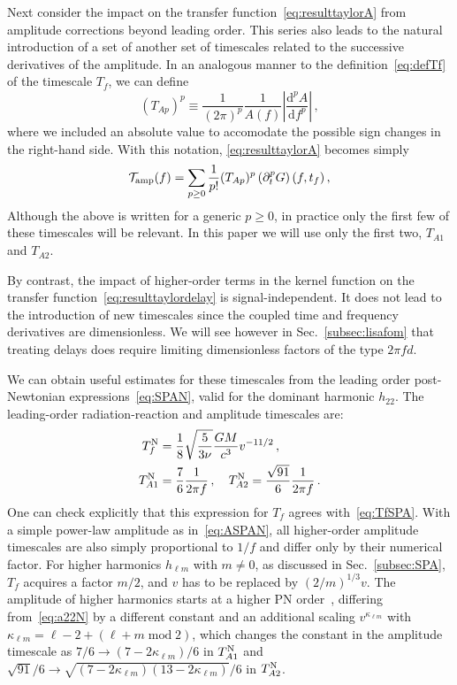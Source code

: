 \documentclass[aps,showpacs,twocolumn,
prd,superscriptaddress,nofootinbib]{revtex4-1}
\newcommand{\be}{\begin{equation}}
\newcommand{\ee}{\end{equation}}
\newcommand\ud{{\mathrm{d}}}
\newcommand\calT{{\mathcal{T}}}
\newcommand{\tf}{t_{f}}
\newcommand{\Tf}{T_{f}}
\newcommand{\jgb}[1]{{\color{DarkGreen} #1}}
\begin{document}
\jgb{Next consider the impact on the transfer function~\eqref{eq:resulttaylorA} from amplitude corrections beyond leading order.}  This series also leads to the natural introduction of a set of another set of timescales related to the successive derivatives of the amplitude. In an analogous manner to the definition~\eqref{eq:defTf} of the timescale $\Tf$, we can define
\be\label{eq:defTA}
	\left( T_{Ap} \right)^{p} \equiv \frac{1}{(2 \pi)^{p}} \frac{1}{A(f)} \left| \frac{\ud^{p} A}{\ud f^{p}} \right| \,,
\ee
where we included an absolute value to accomodate the possible sign changes in the right-hand side. With this notation, \eqref{eq:resulttaylorA} becomes simply
\be\label{eq:resultATA}
	\calT_{\rm amp}(f) = \sum\limits_{p\geq 0} \frac{1}{p!} (T_{Ap})^{p}  \left( \partial_{t}^{p} G \right) (f,\tf) \,,
\ee
Although the above is written for a generic $p\geq 0$, in practice only the first few of these timescales will be relevant. In this paper we will use only the first two, $T_{A1}$ and $T_{A2}$.

\jgb{By contrast, the impact of higher-order terms in the kernel function on the transfer function}~\eqref{eq:resulttaylordelay} is signal-independent. It does not lead to the introduction of new timescales since the coupled time and frequency derivatives are dimensionless. We will see however in Sec.~\ref{subsec:lisafom} that treating delays \jgb{does require limiting} dimensionless factors of the type $2\pi f d$.

We can obtain useful estimates for these timescales from the leading order post-Newtonian expressions~\eqref{eq:SPAN}, valid for the dominant harmonic $h_{22}$. The leading-order radiation-reaction and amplitude timescales are:
\begin{subequations}\label{eq:timescalesN}
\begin{align}
	\Tf^{\rm N} &= \frac{1}{8} \sqrt{\frac{5}{3\nu}} \frac{G M}{c^{3}} v^{-11/2} \,, \label{eq:TfN}\\
	T_{A1}^{\rm N} &= \frac{7}{6} \frac{1}{2\pi f}\,, \quad T_{A2}^{\rm N} = \frac{\sqrt{91}}{6} \frac{1}{2\pi f} \,. \label{eq:TA1N-TA2N}
\end{align}
\end{subequations}
One can check explicitly that this expression for $\Tf$ agrees with~\eqref{eq:TfSPA}. With a simple power-law amplitude as in~\eqref{eq:ASPAN}, all higher-order amplitude timescales are also simply proportional to $1/f$ and differ only by their numerical factor. For higher harmonics $h_{\ell m}$ with $m\neq 0$, as discussed in Sec.~\ref{subsec:SPA}, $T_{f}$ acquires a factor $m/2$, and $v$ has to be replaced by $(2/m)^{1/3} v$. The amplitude of higher harmonics starts at a higher PN order~\cite{BlanchetLiving}, differing from~\eqref{eq:a22N} by a different constant and an additional scaling $v^{\kappa_{\ell m}}$ with $\kappa_{\ell m} = \ell - 2 + (\ell + m \; \mathrm{mod} \; 2)$, which changes the constant in the amplitude timescale as $7/6 \rightarrow (7-2\kappa_{\ell m})/6$ in $T_{A1}^{\rm N}$ and $\sqrt{91}/6 \rightarrow \sqrt{(7-2\kappa_{\ell m})(13-2\kappa_{\ell m})}/6$ in $T_{A2}^{\rm N}$.
\end{document}
